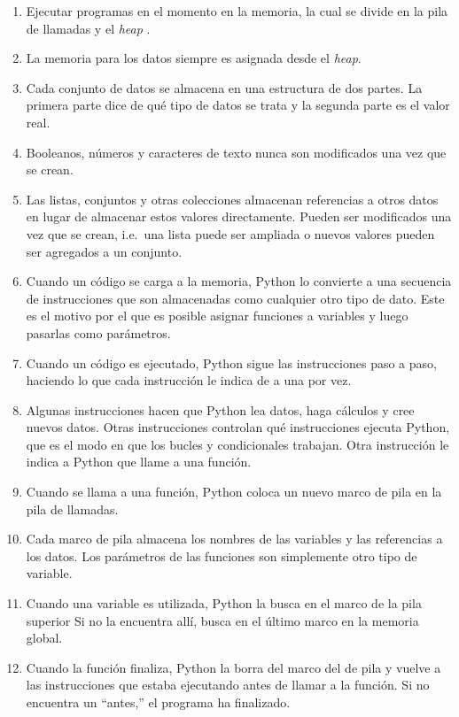 \begin{enumerate}

\item
Ejecutar programas en el momento en la memoria,
la cual se divide en la pila de llamadas y el \emph{heap}  .

\item
  La memoria para los datos siempre es asignada desde el \emph{heap}. 

\item
Cada conjunto de datos se almacena en una estructura de dos partes.
La primera parte dice de qué tipo de datos se trata
y la segunda parte es el valor real.

  \item
  Booleanos, números y caracteres de texto nunca son modificados una vez que se crean. 

\item
Las listas, conjuntos y otras colecciones almacenan referencias a otros datos
en lugar de almacenar estos valores directamente.
Pueden ser modificados una vez que se crean,
i.e.\ una lista puede ser ampliada o nuevos valores pueden ser agregados a un conjunto.
  
\item
Cuando un código se carga a la memoria,
Python lo convierte a una secuencia de instrucciones
que son almacenadas como cualquier otro tipo de dato.
Este es el motivo por el que es posible asignar funciones a variables
y luego pasarlas como parámetros.

\item
Cuando un código es ejecutado,
Python sigue las instrucciones paso a paso,
haciendo lo que cada instrucción le indica de a una por vez.

\item
  Algunas instrucciones hacen que Python lea datos,
haga cálculos
y cree nuevos datos.
Otras instrucciones controlan qué instrucciones ejecuta Python,
que es el modo en que los bucles y condicionales trabajan.
Otra instrucción le indica a Python que llame a una función.

\item
  Cuando se llama a una función,
Python coloca un nuevo marco de pila en la pila de llamadas.

\item
  Cada marco de pila almacena los nombres de las variables y las referencias a los datos.
Los parámetros de las funciones son simplemente otro tipo de variable.

\item
Cuando una variable es utilizada,
Python la busca en el marco de la pila superior
Si no la encuentra allí, busca en el último marco en la memoria global.
 
\item
Cuando la función finaliza, 
Python la borra del marco del de pila y vuelve
a las instrucciones que estaba ejecutando antes de llamar a la función.
Si no encuentra un ``antes,''
  el programa ha finalizado.

\end{enumerate}

